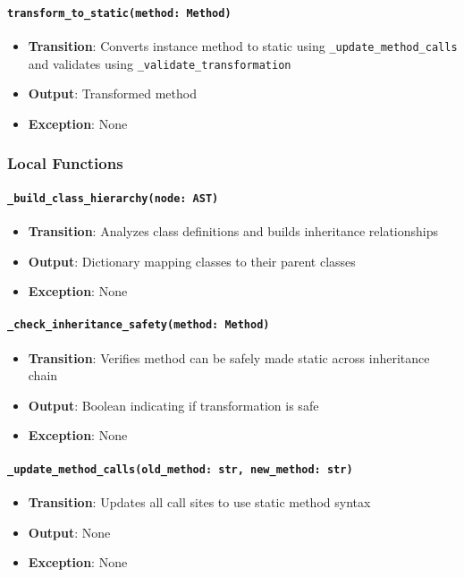 \documentclass[12pt, titlepage]{article}
\begin{document}
\paragraph{\texttt{transform\_to\_static(method: Method)}}
\begin{itemize}
  \item \textbf{Transition}: Converts instance method to static using \texttt{\_update\_method\_calls} and validates using \texttt{\_validate\_transformation}
  \item \textbf{Output}: Transformed method
  \item \textbf{Exception}: None
\end{itemize}

\subsubsection{Local Functions}

\paragraph{\texttt{\_build\_class\_hierarchy(node: AST)}}
\begin{itemize}
  \item \textbf{Transition}: Analyzes class definitions and builds inheritance relationships
  \item \textbf{Output}: Dictionary mapping classes to their parent classes
  \item \textbf{Exception}: None
\end{itemize}

\paragraph{\texttt{\_check\_inheritance\_safety(method: Method)}}
\begin{itemize}
  \item \textbf{Transition}: Verifies method can be safely made static across inheritance chain
  \item \textbf{Output}: Boolean indicating if transformation is safe
  \item \textbf{Exception}: None
\end{itemize}

\paragraph{\texttt{\_update\_method\_calls(old\_method: str, new\_method: str)}}
\begin{itemize}
  \item \textbf{Transition}: Updates all call sites to use static method syntax
  \item \textbf{Output}: None
  \item \textbf{Exception}: None
\end{itemize}
\end{document}
